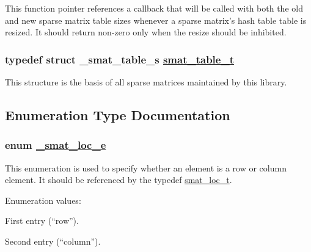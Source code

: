 This function pointer references a callback that will be called with both the old and new sparse matrix table sizes whenever a sparse matrix's hash table table is resized. It should return non-zero only when the resize should be inhibited. \hypertarget{group__dbprim__smat_a0}{
\subsubsection[smat\_\-table\_\-t]{\setlength{\rightskip}{0pt plus 5cm}typedef struct \_\-smat\_\-table\_\-s \hyperlink{dbprim_8h_a0}{smat\_\-table\_\-t}}}
\label{group__dbprim__smat_a0}


This structure is the basis of all sparse matrices maintained by this library. 

\subsection{Enumeration Type Documentation}
\hypertarget{group__dbprim__smat_a47}{
\subsubsection[\_\-smat\_\-loc\_\-e]{\setlength{\rightskip}{0pt plus 5cm}enum \hyperlink{group__dbprim__smat_a47}{\_\-smat\_\-loc\_\-e}}}
\label{group__dbprim__smat_a47}


This enumeration is used to specify whether an element is a row or column element. It should be referenced by the typedef \hyperlink{group__dbprim__smat_a6}{smat\_\-loc\_\-t}. \begin{Desc}
\item[Enumeration values: ]\par
\begin{description}
\item[{\em 
\hypertarget{group__dbprim__smat_a47a135}{
SMAT\_\-LOC\_\-FIRST}
\label{group__dbprim__smat_a47a135}
}]First entry (``row''). \item[{\em 
\hypertarget{group__dbprim__smat_a47a136}{
SMAT\_\-LOC\_\-SECOND}
\label{group__dbprim__smat_a47a136}
}]Second entry (``column''). \end{description}
\end{Desc}




